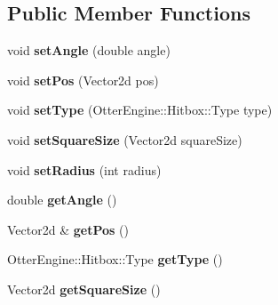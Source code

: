 \subsection*{Public Member Functions}
\begin{DoxyCompactItemize}
\item 
void {\bfseries set\+Angle} (double angle)\hypertarget{class_otter_engine_1_1_hitbox_a0d3b69c556a188885a9464f7f6b6f0da}{}\label{class_otter_engine_1_1_hitbox_a0d3b69c556a188885a9464f7f6b6f0da}

\item 
void {\bfseries set\+Pos} (Vector2d pos)\hypertarget{class_otter_engine_1_1_hitbox_a68bf012c34422c978ee9a98c540467e1}{}\label{class_otter_engine_1_1_hitbox_a68bf012c34422c978ee9a98c540467e1}

\item 
void {\bfseries set\+Type} (Otter\+Engine\+::\+Hitbox\+::\+Type type)\hypertarget{class_otter_engine_1_1_hitbox_abaac2d61b33b45c97da2a983b1540f02}{}\label{class_otter_engine_1_1_hitbox_abaac2d61b33b45c97da2a983b1540f02}

\item 
void {\bfseries set\+Square\+Size} (Vector2d square\+Size)\hypertarget{class_otter_engine_1_1_hitbox_ab85c9d33985e9d2d92b1f6abe77bb2b1}{}\label{class_otter_engine_1_1_hitbox_ab85c9d33985e9d2d92b1f6abe77bb2b1}

\item 
void {\bfseries set\+Radius} (int radius)\hypertarget{class_otter_engine_1_1_hitbox_a5e198d9a390bdc43fb4a2448bd52bed7}{}\label{class_otter_engine_1_1_hitbox_a5e198d9a390bdc43fb4a2448bd52bed7}

\item 
double {\bfseries get\+Angle} ()\hypertarget{class_otter_engine_1_1_hitbox_a1a8b780b2e0447816b1c68ddf1de234d}{}\label{class_otter_engine_1_1_hitbox_a1a8b780b2e0447816b1c68ddf1de234d}

\item 
Vector2d \& {\bfseries get\+Pos} ()\hypertarget{class_otter_engine_1_1_hitbox_a77637ae1e63bde5c988e3d081524c033}{}\label{class_otter_engine_1_1_hitbox_a77637ae1e63bde5c988e3d081524c033}

\item 
Otter\+Engine\+::\+Hitbox\+::\+Type {\bfseries get\+Type} ()\hypertarget{class_otter_engine_1_1_hitbox_a548f55d1d610101c5c4df13d0746995c}{}\label{class_otter_engine_1_1_hitbox_a548f55d1d610101c5c4df13d0746995c}

\item 
Vector2d {\bfseries get\+Square\+Size} ()\hypertarget{class_otter_engine_1_1_hitbox_adedb78046a366893918cc911a561502f}{}\label{class_otter_engine_1_1_hitbox_adedb78046a366893918cc911a561502f}


\end{DoxyCompactItemize}
